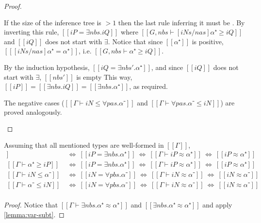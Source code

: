 \begin{proof}
\begin{caseof}
    If the size of the inference tree is $>1$ then the last rule inferring
    it must be . By inverting this rule,
    $[[iP = ∃nbs.iQ]]$ where $[[G, nbs ⊢ [iNs/nas]α⁺ ≥ iQ]]$ and $[[iQ]]$ 
    does not start with $\exists$.
    Notice that since $[[α⁺]]$ is positive, $[[ [iNs/nas]α⁺ = α⁺]]$, 
    i.e. $[[G, nbs ⊢ α⁺ ≥ iQ]]$.

    By the induction hypothesis, $[[iQ = ∃nbs'.α⁺]]$,
    and since $[[iQ]]$ does not start with $\exists$, $[[nbs']]$ is empty
    This way, $[[iP]] = [[∃nbs.iQ]] = [[∃nbs.α⁺]]$, as required.

  \item The negative cases ($[[Γ ⊢ iN ≤ ∀pas.α⁻]]$ and $[[Γ ⊢ ∀pas.α⁻ ≤ iN ]]$)
    are proved analogously.
  \end{caseof}
\end{proof}

\begin{corollary}
  \label{corollary:vars-no-proper-subtypes}
  Assuming that all mentioned types are well-formed in $[[Γ]]$,
  \begin{align*}
    [[Γ ⊢ iP ≥ α⁺]] ~ &\iff ~ [[iP = ∃nbs.α⁺]]  ~ \iff ~ [[Γ ⊢ iP ≈ α⁺]] ~ \iff ~ [[iP ≈ α⁺]]\\
    [[Γ ⊢ α⁺≥ iP]]  ~ &\iff ~ [[iP = ∃nbs.α⁺]]  ~ \iff ~ [[Γ ⊢ iP ≈ α⁺]] ~ \iff ~ [[iP ≈ α⁺]]\\
    [[Γ ⊢ iN ≤ α⁻]] ~ &\iff ~ [[iN = ∀pbs.α⁻]]  ~ \iff ~ [[Γ ⊢ iN ≈ α⁻]] ~ \iff ~ [[iN ≈ α⁻]]\\
    [[Γ ⊢ α⁻ ≤ iN]] ~ &\iff ~ [[iN = ∀pbs.α⁻]]  ~ \iff ~ [[Γ ⊢ iN ≈ α⁻]] ~ \iff ~ [[iN ≈ α⁻]]\\
  \end{align*}
\end{corollary}
\begin{proof}
  Notice that $[[Γ ⊢ ∃nbs.α⁺ ≈ α⁺]]$ and $[[∃nbs.α⁺ ≈ α⁺]]$ and apply
  \cref{lemma:var-subt}.
\end{proof}



